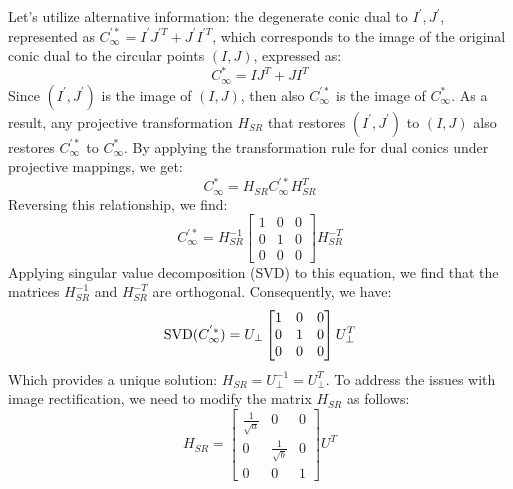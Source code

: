 Let's utilize alternative information: the degenerate conic dual to $I^{'},J^{'}$, represented as $C_{\infty}^{'*}=I^{'}J^{'T}+J^{'}I^{'T}$, which corresponds to the image of the original conic dual to the circular points $(I,J)$, expressed as: 
\[C_{\infty}^{*}=IJ^{T}+JI^{T}\]
Since $(I^{'},J^{'})$ is the image of $(I,J)$, then also $C_{\infty}^{'*}$ is the image of $C_{\infty}^{*}$. 
As a result, any projective transformation $H_{SR}$ that restores $(I^{'},J^{'})$ to $(I,J)$ also restores $C_{\infty}^{'*}$ to $C_{\infty}^{*}$. 
By applying the transformation rule for dual conics under projective mappings, we get:
\[C^{*}_{\infty}=H_{SR}C^{'*}_{\infty}H_{SR}^T\]
Reversing this relationship, we find:
\[C_{\infty}^{'*}=H_{SR}^{-1} 
\begin{bmatrix}
    1 & 0 & 0 \\
    0 & 1 & 0 \\
    0 & 0 & 0
\end{bmatrix}
H_{SR}^{-T}\]
Applying singular value decomposition (SVD) to this equation, we find that the matrices $H_{SR}^{-1}$ and $H_{SR}^{-T}$ are orthogonal. 
Consequently, we have:
\[\textnormal{SVD}(C_{\infty}^{'*})=U_\perp
\begin{bmatrix}
    1 & 0 & 0 \\
    0 & 1 & 0 \\
    0 & 0 & 0
\end{bmatrix}
U_{\perp}^T\]
Which provides a unique solution: $H_{SR}=U_{\perp}^{-1}=U_{\perp}^T$. 
To address the issues with image rectification, we need to modify the matrix $H_{SR}$ as follows:
\[H_{SR}=
\begin{bmatrix}
    \frac{1}{\sqrt{a}} & 0 & 0 \\
    0 & \frac{1}{\sqrt{b}} & 0 \\
    0 & 0 & 1
\end{bmatrix}
U^T
\]

